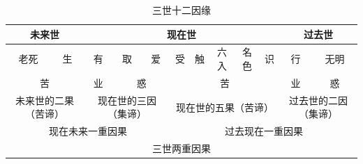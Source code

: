 \begin{table}[H]
  \centering
  \small
  \caption[]{三世十二因缘}
  \begin{tabular}{|c|c|c|c|c|c|c|c|c|c|c|c|}
    \hline \multicolumn{2}{|c|}{未来世} & \multicolumn{8}{|c|}{现在世} & \multicolumn{2}{|c|}{过去世} \\
    \hline 老死 & 生 & 有 & 取 & 爱 & 受 & 触 & 六入 & 名色 & 识 & 行 & 无明 \\
    \hline \multicolumn{2}{|c|}{苦} & 业 & \multicolumn{2}{|c|}{惑} & \multicolumn{5}{|c|}{苦} & 业 & 惑 \\
    \hline \multicolumn{2}{|c|}{未来世的二果（苦谛）} & \multicolumn{3}{|c|}{现在世的三因（集谛）} & \multicolumn{5}{|c|}{现在世的五果（苦谛）} & \multicolumn{2}{|c|}{过去世的二因（集谛）} \\
    \hline \multicolumn{5}{|c|}{现在未来一重因果} & \multicolumn{7}{|c|}{过去现在一重因果} \\
    \hline \multicolumn{12}{|c|}{三世两重因果} \\
    \hline
  \end{tabular}
\end{table}
